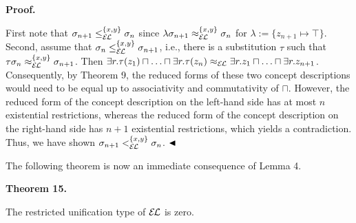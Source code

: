 \documentclass[10pt,a4paper]{amsart}
\begin{document}
 
 
 
 
\par\medskip\noindent\textbf{Proof.}\par
 
 
First note that $\sigma_{n+1}\leq_{\mathcal{E\mkern-1.618muL}}^{\{x,y\}}\sigma_{n}$ since $\lambda\sigma_{n+1}\approx_{\mathcal{E\mkern-1.618muL}}^{\{x,y\}}\sigma_{n}$ for $\lambda:=\{z_{n+1}\mapsto\top\}$. Second, assume that $\sigma_{n}\leq_{\mathcal{E\mkern-1.618muL}}^{\{x,y\}}\sigma_{n+1}$, i.e., there is a substitution $\tau$ such that $\tau\sigma_{n}\approx_{\mathcal{E\mkern-1.618muL}}^{\{x,y\}}\sigma_{n+1}$. Then $\exists r.\tau(z_{1})\sqcap\ldots\sqcap\exists r.\tau(z_{n})\approx_{\mathcal{%
E\mkern-1.618muL}}\exists r.z_{1}\sqcap\ldots\sqcap\exists r.z_{n+1}$. Consequently, by Theorem 9, the reduced forms of these two concept descriptions would need to be equal up to associativity and commutativity of $\sqcap$. However, the reduced form of the concept description on the left-hand side has at most $n$ existential restrictions, whereas the reduced form of the concept description on the right-hand side has $n+1$ existential restrictions, which yields a contradiction. Thus, we have shown $\sigma_{n+1}<_{\mathcal{E\mkern-1.618muL}}^{\{x,y\}}\sigma_{n}$. $\hfill\blacktriangleleft$\par
 
 
 
The following theorem is now an immediate consequence of Lemma 4.\par
 
 
 
\par\medskip\noindent\textbf{Theorem 15.}\par
 
 
The restricted unification type of $\mathcal{E\mkern-1.618muL}$ is zero.\par
 
 
 
\end{document}

